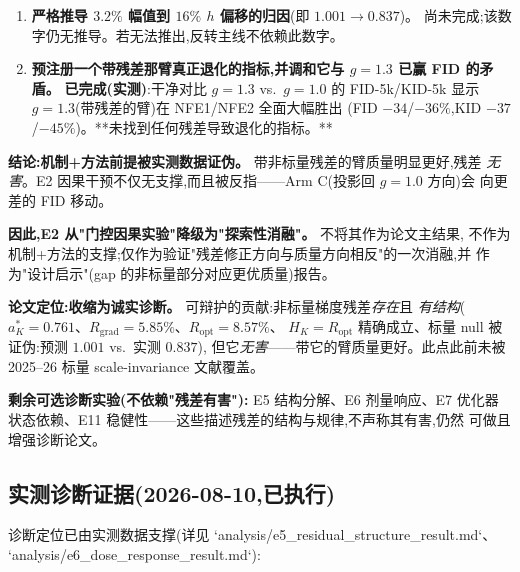 \documentclass[UTF8,11pt,a4paper]{ctexart}
\begin{document}
\begin{enumerate}[leftmargin=*,itemsep=1pt]
  \item \textbf{严格推导 $3.2\%$ 幅值到 $16\%$ $h$ 偏移的归因}(即 $1.001\to0.837$)。
        尚未完成;该数字仍无推导。若无法推出,反转主线不依赖此数字。
  \item \textbf{预注册一个带残差那臂真正退化的指标,并调和它与 $g{=}1.3$ 已赢 FID
        的矛盾。} \textbf{已完成(实测)}:干净对比 $g{=}1.3$ vs.\ $g{=}1.0$ 的
        FID-5k/KID-5k 显示 $g{=}1.3$(带残差的臂)在 NFE1/NFE2 全面大幅胜出
        (FID $-34$/$-36\%$,KID $-37$/$-45\%$)。**未找到任何残差导致退化的指标。**
\end{enumerate}

\textbf{结论:机制+方法前提被实测数据证伪。} 带非标量残差的臂质量明显更好,残差
\emph{无害}。E2 因果干预不仅无支撑,而且被反指——Arm C(投影回 $g{=}1.0$ 方向)会
向更差的 FID 移动。

\textbf{因此,E2 从"门控因果实验"降级为"探索性消融"。} 不将其作为论文主结果,
不作为机制+方法的支撑;仅作为验证"残差修正方向与质量方向相反"的一次消融,并
作为"设计启示"(gap 的非标量部分对应更优质量)报告。

\textbf{论文定位:收缩为诚实诊断。} 可辩护的贡献:非标量梯度残差\emph{存在}且
\emph{有结构}($a_K^*{=}0.761$、$R_{\mathrm{grad}}{=}5.85\%$、$R_{\mathrm{opt}}{=}8.57\%$、
$H_K{=}R_{\mathrm{opt}}$ 精确成立、标量 null 被证伪:预测 $1.001$ vs.\ 实测 $0.837$),
但它\emph{无害}——带它的臂质量更好。此点此前未被 2025--26 标量 scale-invariance
文献覆盖。

\textbf{剩余可选诊断实验(不依赖"残差有害"):} E5 结构分解、E6 剂量响应、E7
优化器状态依赖、E11 稳健性——这些描述残差的结构与规律,不声称其有害,仍然
可做且增强诊断论文。

\subsection{实测诊断证据(2026-08-10,已执行)}
诊断定位已由实测数据支撑(详见 `analysis/e5\_residual\_structure\_result.md`、
`analysis/e6\_dose\_response\_result.md`):
\end{document}
